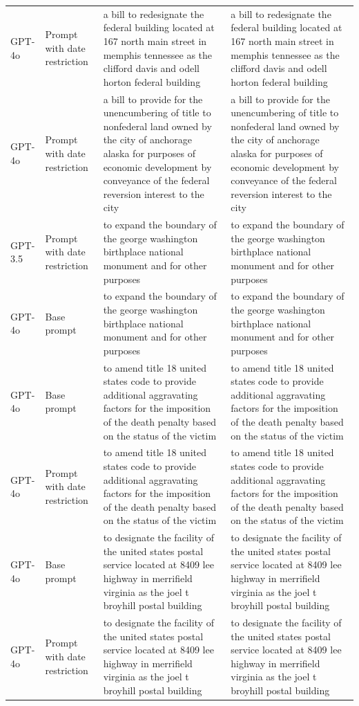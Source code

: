 \begin{longtable}{>{\raggedright\arraybackslash}p{1.4cm}>{\raggedright\arraybackslash}p{1.4cm}>{\raggedright\arraybackslash}p{5.5cm}>{\raggedright\arraybackslash}p{5.5cm}}
GPT-4o & Prompt with date restriction & a bill to redesignate the federal building located at 167 north main street in memphis tennessee as the clifford davis and odell horton federal building & a bill to redesignate the federal building located at 167 north main street in memphis tennessee as the clifford davis and odell horton federal building\\
GPT-4o & Prompt with date restriction & a bill to provide for the unencumbering of title to nonfederal land owned by the city of anchorage alaska for purposes of economic development by conveyance of the federal reversion interest to the city & a bill to provide for the unencumbering of title to nonfederal land owned by the city of anchorage alaska for purposes of economic development by conveyance of the federal reversion interest to the city\\
GPT-3.5 & Prompt with date restriction & to expand the boundary of the george washington birthplace national monument and for other purposes & to expand the boundary of the george washington birthplace national monument and for other purposes\\
GPT-4o & Base prompt & to expand the boundary of the george washington birthplace national monument and for other purposes & to expand the boundary of the george washington birthplace national monument and for other purposes\\
GPT-4o & Base prompt & to amend title 18 united states code to provide additional aggravating factors for the imposition of the death penalty based on the status of the victim & to amend title 18 united states code to provide additional aggravating factors for the imposition of the death penalty based on the status of the victim\\
GPT-4o & Prompt with date restriction & to amend title 18 united states code to provide additional aggravating factors for the imposition of the death penalty based on the status of the victim & to amend title 18 united states code to provide additional aggravating factors for the imposition of the death penalty based on the status of the victim\\
GPT-4o & Base prompt & to designate the facility of the united states postal service located at 8409 lee highway in merrifield virginia as the joel t broyhill postal building & to designate the facility of the united states postal service located at 8409 lee highway in merrifield virginia as the joel t broyhill postal building\\
GPT-4o & Prompt with date restriction & to designate the facility of the united states postal service located at 8409 lee highway in merrifield virginia as the joel t broyhill postal building & to designate the facility of the united states postal service located at 8409 lee highway in merrifield virginia as the joel t broyhill postal building\\

\end{longtable}
